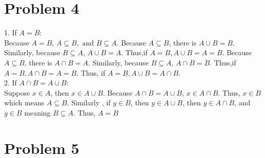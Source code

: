 \documentclass[a4paper,fleqn]{article}
\begin{document}
\section*{Problem 4}
    1. If \(A=B\):\\ 
    Because \(A=B\), \(A \subseteq B, \text{ and }B\subseteq A\). Because \(A\subseteq B\), there is \(A\cup B = B\). Similarly, 
    because \(B\subseteq A\), \(A\cup B = A\). Thus,if \( A=B, A\cup B = A = B\). Because \(A\subseteq B\), there is \(A\cap B = A\). Similarly, 
    because \(B\subseteq A\), \(A\cap B = B\). Thus,if \( A=B, A\cap B = A = B\). Thus, if \( A=B, A\cup B = A\cap B\).
    \\2. If \(A\cap B = A\cup B\):\\
    Suppose \(x\in A\), then \(x\in A\cup B\). Because \(A\cap B = A\cup B\), \(x\in A\cap B\). Thus, \(x\in B\) which means 
    \(A \subseteq B\). Similarly , if \(y\in B\), then \(y\in A\cup B\), then \(y\in A\cap B\), and \(y\in B\) meaning \(B\subseteq A\). Thus, \(A=B\)
\section*{Problem 5}
    
\end{document}
